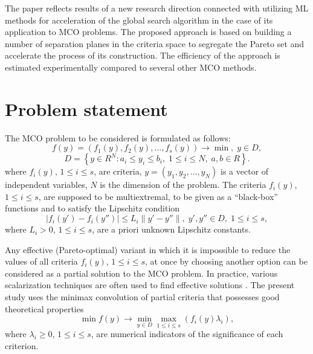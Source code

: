 \documentclass[runningheads]{llncs}
\begin{document}
The paper reflects results of a new research direction connected with utilizing ML methods for acceleration of the global search algorithm in the case of its application to MCO problems. The proposed approach is based on building a number of separation planes in the criteria space to segregate the Pareto set and accelerate the process of its construction. The efficiency of the approach is estimated experimentally compared to several other MCO methods.


\section{Problem statement}

The MCO problem to be considered is formulated as follows:
\begin{equation}
f(y)=(f_1 (y),f_2 (y),\dots ,f_s (y)) \to \min, \; y\in D,
\label{eq:1}
\end{equation}
\begin{equation}
D=\left\{ y \in R^N: a_i \leq y_i \leq b_i, \; 1 \leq i \leq N, \; a,b \in R \right\}.
\label{eq:2}
\end{equation}
where $f_i (y)$, $1 \leq i \leq s$, are  criteria, $y=(y_1,y_2, \dots,y_N)$ is a vector of independent variables, $N$ is the dimension of the problem. The criteria $f_i (y)$, $1 \leq i \leq s$, are supposed to be multiextremal, to be given as a ``black-box'' functions and to satisfy the Lipschitz condition
\begin{equation}
|f_i (y')-f_i (y'')| \leq L_i \|y'-y''\|, \; y',y'' \in D, \; 1 \leq i \leq s,
\label{eq:3}
\end{equation}
where $L_i>0$, $1 \leq i \leq s$, are a priori unknown Lipschitz constants.

Any effective (Pareto-optimal) variant  in which it is impossible to reduce the values of all criteria $f_i (y)$, $1 \leq i \leq s$, at once by choosing another option   can be considered as a partial solution to the MCO problem. In practice, various scalarization techniques are often used to find effective solutions \cite{Ehrgott2005,Pardalos2017,Marler2004,GergelKozinov2020}. The present study uses the minimax convolution of partial criteria that possesses good theoretical properties
\begin{equation}
\min{f(y)} \to \min_{y\in D}{\max_{1 \leq i \leq s}{(f_i (y) \lambda_i )}} ,
\label{eq:4}
\end{equation}
where $\lambda_i \geq 0$, $1 \leq i \leq s$, are numerical indicators of the significance of each criterion. 
\end{document}
